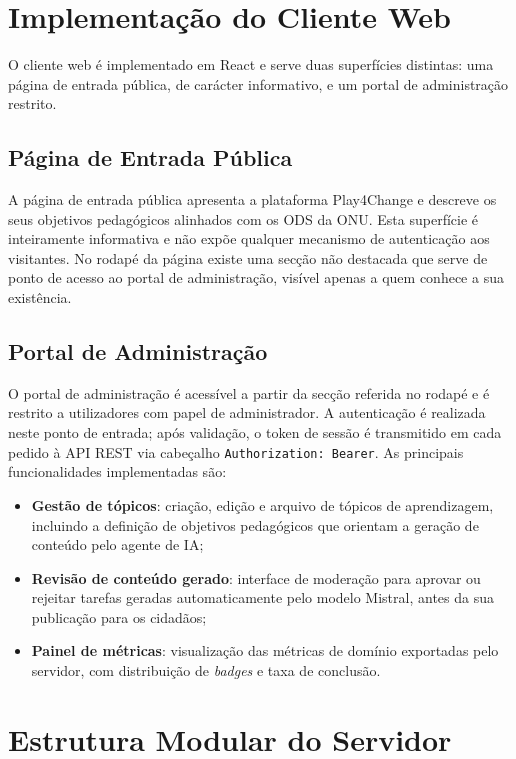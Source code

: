 \section{Implementação do Cliente Web}
\label{sec:impl_cliente_web}

O cliente web é implementado em React e serve duas superfícies distintas: uma página de entrada pública, de carácter informativo, e um portal de administração restrito.

\subsection*{Página de Entrada Pública}

A página de entrada pública apresenta a plataforma Play4Change e descreve os seus objetivos pedagógicos alinhados com os ODS da ONU. Esta superfície é inteiramente informativa e não expõe qualquer mecanismo de autenticação aos visitantes. No rodapé da página existe uma secção não destacada que serve de ponto de acesso ao portal de administração, visível apenas a quem conhece a sua existência.

\subsection*{Portal de Administração}

O portal de administração é acessível a partir da secção referida no rodapé e é restrito a utilizadores com papel de administrador. A autenticação é realizada neste ponto de entrada; após validação, o token de sessão é transmitido em cada pedido à API REST via cabeçalho \texttt{Authorization: Bearer}. As principais funcionalidades implementadas são:

\begin{itemize}
  \item \textbf{Gestão de tópicos}: criação, edição e arquivo de tópicos de aprendizagem, incluindo a definição de objetivos pedagógicos que orientam a geração de conteúdo pelo agente de IA;
  \item \textbf{Revisão de conteúdo gerado}: interface de moderação para aprovar ou rejeitar tarefas geradas automaticamente pelo modelo Mistral, antes da sua publicação para os cidadãos;
  \item \textbf{Painel de métricas}: visualização das métricas de domínio exportadas pelo servidor, com distribuição de \textit{badges} e taxa de conclusão.
\end{itemize}

\section{Estrutura Modular do Servidor}
\label{sec:modulos_servidor}

